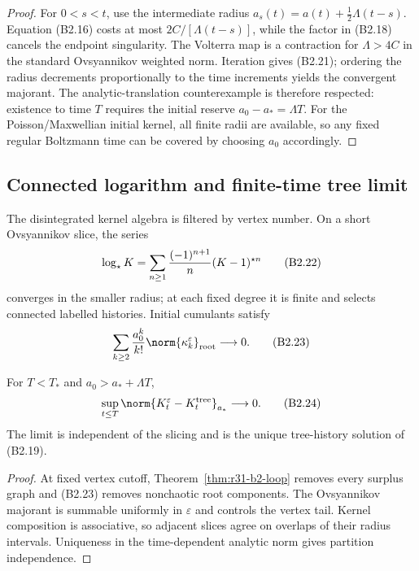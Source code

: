 \begin{proof}
For $0<s<t$, use the intermediate radius
$a_s(t)=a(t)+\frac12\Lambda(t-s)$.  Equation (B2.16) costs at most
$2C/[\Lambda(t-s)]$, while the factor in (B2.18) cancels the endpoint
singularity.  The Volterra map is a contraction for $\Lambda>4C$ in the
standard Ovsyannikov weighted norm.  Iteration gives (B2.21); ordering the
radius decrements proportionally to the time increments yields the convergent
majorant.  The analytic-translation counterexample is therefore respected:
existence to time $T$ requires the initial reserve $a_0-a_* =\Lambda T$.
For the Poisson/Maxwellian initial kernel, all finite radii are available, so
any fixed regular Boltzmann time can be covered by choosing $a_0$ accordingly.
\end{proof}

\subsection{Connected logarithm and finite-time tree limit}

The disintegrated kernel algebra is filtered by vertex number.  On a short
Ovsyannikov slice, the series
\[
 \log_\star K=
 \sum_{n\ge1}{(-1)^{n+1}\over n}(K-1)^{\star n}           \tag{B2.22}
\]
converges in the smaller radius; at each fixed degree it is finite and selects
connected labelled histories.  Initial cumulants satisfy
\[
 \sum_{k\ge2}{a_0^k\over k!}\norm{\kappa_k^\varepsilon}_{\rm root}
 \longrightarrow0.                                      \tag{B2.23}
\]

\begin{theorem}
\label{thm:r31-b2-propagation}
For $T<T_*$ and $a_0>a_*+\Lambda T$,
\[
 \sup_{t\le T}\norm{K_t^\varepsilon-K_t^{\rm tree}}_{a_*}
 \longrightarrow0.                                      \tag{B2.24}
\]
The limit is independent of the slicing and is the unique tree-history
solution of (B2.19).
\end{theorem}

\begin{proof}
At fixed vertex cutoff, Theorem~\ref{thm:r31-b2-loop} removes every surplus
graph and (B2.23) removes nonchaotic root components.  The Ovsyannikov
majorant is summable uniformly in $\varepsilon$ and controls the vertex tail.
Kernel composition is associative, so adjacent slices agree on overlaps of
their radius intervals.  Uniqueness in the time-dependent analytic norm gives
partition independence.
\end{proof}

